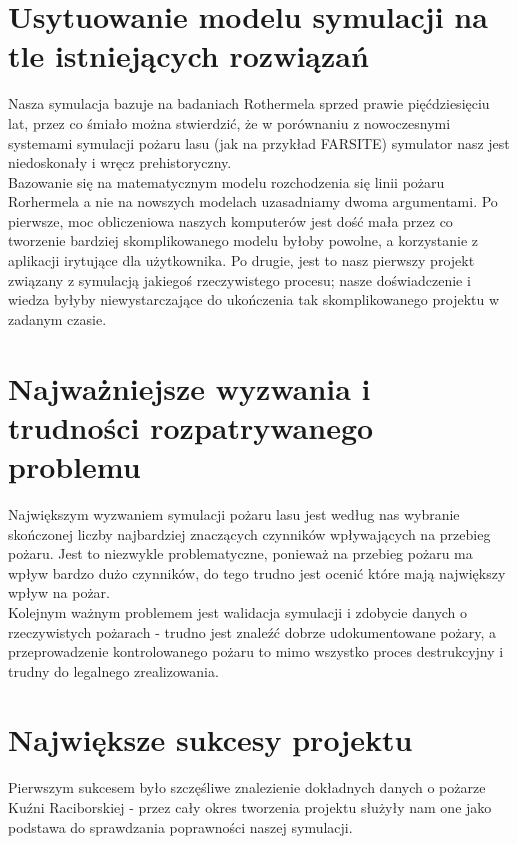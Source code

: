 \documentclass[a4paper, 11pt]{article}
\begin{document}
	\section*{Usytuowanie modelu symulacji na tle istniejących rozwiązań}
	\indent
	
	Nasza symulacja bazuje na badaniach Rothermela sprzed prawie pięćdziesięciu lat, przez co śmiało można stwierdzić, że w porównaniu z nowoczesnymi systemami symulacji pożaru lasu (jak na przykład FARSITE) symulator nasz jest niedoskonały i wręcz prehistoryczny. \\
	
	Bazowanie się na matematycznym modelu rozchodzenia się linii pożaru Rorhermela a nie na nowszych modelach uzasadniamy dwoma argumentami. Po pierwsze, moc obliczeniowa naszych komputerów jest dość mała przez co tworzenie bardziej skomplikowanego modelu byłoby powolne, a korzystanie z aplikacji irytujące dla użytkownika. Po drugie, jest to nasz pierwszy projekt związany z symulacją jakiegoś rzeczywistego procesu; nasze doświadczenie i wiedza byłyby niewystarczające do ukończenia tak skomplikowanego projektu w zadanym czasie.
	\section*{Najważniejsze wyzwania i trudności rozpatrywanego problemu}
	\indent
	
	Największym wyzwaniem symulacji pożaru lasu jest według nas wybranie skończonej liczby najbardziej znaczących czynników wpływających na przebieg pożaru. Jest to niezwykle problematyczne, ponieważ na przebieg pożaru ma wpływ bardzo dużo czynników, do tego trudno jest ocenić które mają największy wpływ na pożar. \\
	
	Kolejnym ważnym problemem jest walidacja symulacji i zdobycie danych o rzeczywistych pożarach - trudno jest znaleźć dobrze udokumentowane pożary, a przeprowadzenie kontrolowanego pożaru to mimo wszystko proces destrukcyjny i trudny do legalnego zrealizowania.
	\section*{Największe sukcesy projektu}
	\indent
	
	Pierwszym sukcesem było szczęśliwe znalezienie dokładnych danych o pożarze Kuźni Raciborskiej - przez cały okres tworzenia projektu służyły nam one jako podstawa do sprawdzania poprawności naszej symulacji.\\
	
\end{document}
